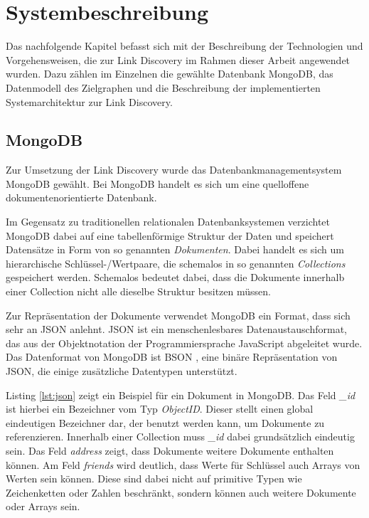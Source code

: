 \chapter{Systembeschreibung}
\label{system}

Das nachfolgende Kapitel befasst sich mit der Beschreibung der Technologien und Vorgehensweisen, die zur Link Discovery im Rahmen dieser Arbeit angewendet wurden. Dazu zählen im Einzelnen die gewählte Datenbank MongoDB, das Datenmodell des Zielgraphen und die Beschreibung der implementierten Systemarchitektur zur Link Discovery.

\section{MongoDB}
\label{mongo}

Zur Umsetzung der Link Discovery wurde das Datenbankmanagementsystem MongoDB \cite{mo2013} gewählt. Bei MongoDB handelt es sich um eine quelloffene dokumentenorientierte Datenbank.

Im Gegensatz zu traditionellen relationalen Datenbanksystemen verzichtet MongoDB dabei auf eine tabellenförmige Struktur der Daten und speichert Datensätze in Form von so genannten \emph{Dokumenten}. Dabei handelt es sich um hierarchische Schlüssel-/Wertpaare, die schemalos in so genannten \emph{Collections} gespeichert werden. Schemalos bedeutet dabei, dass die Dokumente innerhalb einer Collection nicht alle dieselbe Struktur besitzen müssen.

Zur Repräsentation der Dokumente verwendet MongoDB ein Format, dass sich sehr an JSON \cite{json2006} anlehnt. JSON ist ein menschenlesbares Datenaustauschformat, das aus der Objektnotation der Programmiersprache JavaScript abgeleitet wurde. Das Datenformat von MongoDB ist BSON \cite{bson2013}, eine binäre Repräsentation von JSON, die einige zusätzliche Datentypen unterstützt. 

Listing \ref{lst:json} zeigt ein Beispiel für ein Dokument in MongoDB. Das Feld \emph{\_id} ist hierbei ein  Bezeichner vom Typ \emph{ObjectID}. Dieser stellt einen global eindeutigen Bezeichner dar, der benutzt werden kann, um Dokumente zu referenzieren. Innerhalb einer Collection muss \emph{\_id} dabei grundsätzlich eindeutig sein. Das Feld \emph{address} zeigt, dass Dokumente weitere Dokumente enthalten können. Am Feld \emph{friends} wird deutlich, dass Werte für Schlüssel auch Arrays von Werten sein können. Diese sind dabei nicht auf primitive Typen wie Zeichenketten oder Zahlen beschränkt, sondern können auch weitere Dokumente oder Arrays sein.

